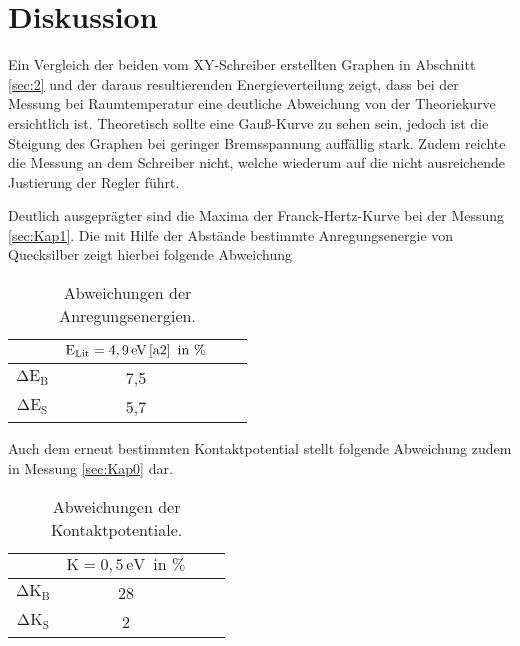 \section{Diskussion}

\begin{flushleft}
    Ein Vergleich der beiden vom XY-Schreiber erstellten Graphen in Abschnitt \ref{sec:2} und der daraus resultierenden Energieverteilung zeigt, dass bei der Messung bei Raumtemperatur eine deutliche Abweichung von der Theoriekurve ersichtlich ist.
    Theoretisch sollte eine Gauß-Kurve zu sehen sein, jedoch ist die Steigung des Graphen bei geringer Bremsspannung auffällig stark.
    Zudem reichte die Messung an dem Schreiber nicht, welche wiederum auf die nicht ausreichende Justierung der Regler führt.
\end{flushleft}

\begin{flushleft}
    Deutlich ausgeprägter sind die Maxima der Franck-Hertz-Kurve bei der Messung \ref{sec:Kap1}.
    Die mit Hilfe der Abstände bestimmte Anregungsenergie von Quecksilber zeigt hierbei folgende Abweichung
\end{flushleft}

\begin{table}[H]
    \centering
    \caption{Abweichungen der Anregungsenergien.} 
    \label{Tabelle4}
    \begin{tabular} {c | c  c  c}
        \toprule
        {$ $} &
        {$ \text{E}_{\text{Lit}} = 4,9\,\text{eV}\,\text{\cite{a2}} \,\,\,\text{in \%} $} \\
        \midrule
        $\increment \text{E}_{\text{B}}$ & 7,5 \\
        $\increment \text{E}_{\text{S}}$ & 5,7 \\
        \bottomrule
    \end{tabular} 
\end{table}

\begin{flushleft}
    Auch dem erneut bestimmten Kontaktpotential stellt folgende Abweichung zudem in Messung \ref{sec:Kap0} dar.
\end{flushleft}

\begin{table}[H]
    \centering
    \caption{Abweichungen der Kontaktpotentiale.} 
    \label{Tabelle4}
    \begin{tabular} {c | c  c  c}
        \toprule
        {$ $} &
        {$ \text{K} = 0,5\,\text{eV} \,\,\,\text{in \%} $} \\
        \midrule
        $\increment \text{K}_{\text{B}}$ & 28 \\
        $\increment \text{K}_{\text{S}}$ & 2 \\
        \bottomrule
    \end{tabular} 
\end{table}

